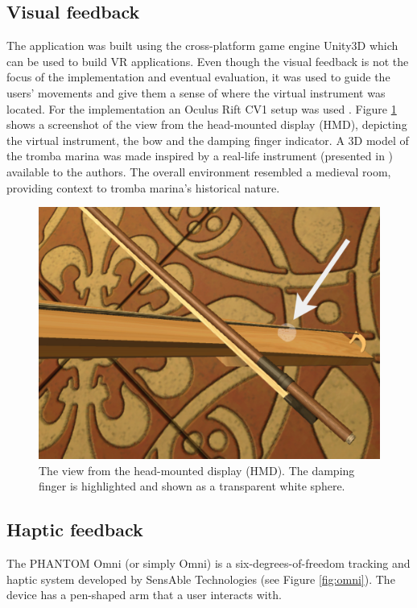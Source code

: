 \documentclass[dvipsnames, pdftex]{article}
\begin{document}
\subsection{Visual feedback}
The application was built using the cross-platform game engine Unity3D \cite{unity} which can be used to build VR applications. Even though the visual feedback is not the focus of the implementation and eventual evaluation, it was used to guide the users' movements and give them a sense of where the virtual instrument was located. For the implementation an Oculus Rift CV1 setup was used \cite{Oculus2020}. Figure \ref{fig:vrView} shows a screenshot of the view from the head-mounted display (HMD), depicting the virtual instrument, the bow and the damping finger indicator. A 3D model of the tromba marina was made inspired by a real-life instrument (presented in \cite{Baldwin2016}) available to the authors. The overall environment resembled a medieval room, providing context to tromba marina's historical nature.

\begin{figure}[ht]\includegraphics[width=1.0\columnwidth]{SMC 2020 paper template LaTeX/figures/vrView.jpg}
\centering
  \caption{The view from the head-mounted display (HMD). The damping finger is highlighted and shown as a transparent white sphere. \label{fig:vrView}}
\end{figure}

\subsection{Haptic feedback}
The PHANTOM Omni (or simply Omni) is a six-degrees-of-freedom tracking and haptic system developed by SensAble Technologies (see Figure \ref{fig:omni}). The device has a pen-shaped arm that a user interacts with.  
\end{document}
